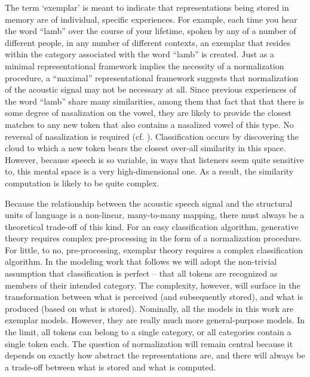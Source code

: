 The term `exemplar' is meant to indicate that representations being
stored in memory are of individual, specific experiences. For example,
each time you hear the word “lamb” over the course of your lifetime,
spoken by any of a number of different people, in any number of different
contexts, an exemplar that resides within the category associated
with the word “lamb” is created. Just as a minimal representational
framework implies the necessity of a normalization procedure, a “maximal”
representational framework suggests that normalization of the acoustic
signal may not be necessary at all. Since previous experiences of
the word “lamb” share many similarities, among them that fact
that that there is some degree of nasalization on the vowel, they
are likely to provide the closest matches to any new token that also
contains a nasalized vowel of this type. No reversal of nasalization
is required (cf. \citealt{Johnson1997a}). Classification occurs by
discovering the cloud to which a new token bears the closest over-all
similarity in this space. However, because speech is so variable,
in ways that listeners seem quite sensitive to, this mental space
is a very high-dimensional one. As a result, the similarity computation
is likely to be quite complex. 

Because the relationship between the acoustic speech signal and the
structural units of language is a non-linear, many-to-many mapping,
there must always be a theoretical trade-off of this kind. For an
easy classification algorithm, generative theory requires complex
pre-processing in the form of a normalization procedure. For little,
to no, pre-processing, exemplar theory requires a complex classification
algorithm. In the modeling work that follows we will adopt the non-trivial
assumption that classification is perfect – that all tokens are recognized
as members of their intended category. The complexity, however, will
surface in the transformation between what is perceived (and subsequently
stored), and what is produced (based on what is stored). Nominally,
all the models in this work are exemplar models. However, they are
really much more general-purpose models. In the limit, all tokens
can belong to a single category, or all categories contain a single
token each. The question of normalization will remain central because
it depends on exactly how abstract the representations are, and there
will always be a trade-off between what is stored and what is computed. 

